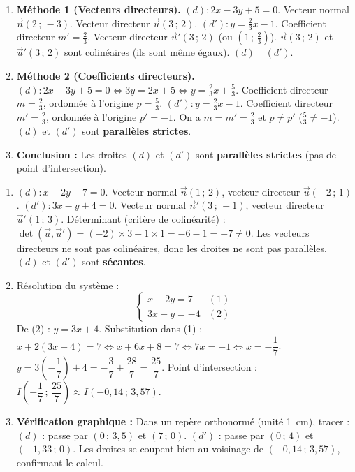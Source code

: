 \documentclass[11pt]{article}
\begin{document}
\begin{corrige}
\begin{enumerate}
\item \textbf{Méthode 1 (Vecteurs directeurs).}
$(d) : 2x - 3y + 5 = 0$. Vecteur normal $\vec{n}(2\,;\,-3)$. Vecteur directeur $\vec{u}(3\,;\,2)$.
$(d') : y = \frac{2}{3}x - 1$. Coefficient directeur $m' = \frac{2}{3}$. Vecteur directeur $\vec{u}'(3\,;\,2)$ (ou $(1\,;\,\frac{2}{3})$).
$\vec{u}(3\,;\,2)$ et $\vec{u}'(3\,;\,2)$ sont colinéaires (ils sont même égaux).
\Rightarrow $(d) \parallel (d')$.
\item \textbf{Méthode 2 (Coefficients directeurs).}
$(d) : 2x - 3y + 5 = 0 \iff 3y = 2x + 5 \iff y = \frac{2}{3}x + \frac{5}{3}$.
Coefficient directeur $m = \frac{2}{3}$, ordonnée à l'origine $p = \frac{5}{3}$.
$(d') : y = \frac{2}{3}x - 1$. Coefficient directeur $m' = \frac{2}{3}$, ordonnée à l'origine $p' = -1$.
On a $m = m' = \frac{2}{3}$ et $p \neq p'$ ($\frac{5}{3} \neq -1$).
\Rightarrow $(d)$ et $(d')$ sont \textbf{parallèles strictes}.
\item \textbf{Conclusion :} Les droites $(d)$ et $(d')$ sont \textbf{parallèles strictes} (pas de point d'intersection).
\end{enumerate}
\end{corrige}

\begin{corrige}
\begin{enumerate}
\item $(d) : x + 2y - 7 = 0$. Vecteur normal $\vec{n}(1\,;\,2)$, vecteur directeur $\vec{u}(-2\,;\,1)$.
$(d') : 3x - y + 4 = 0$. Vecteur normal $\vec{n}'(3\,;\,-1)$, vecteur directeur $\vec{u}'(1\,;\,3)$.
Déterminant (critère de colinéarité) : $\det(\vec{u},\vec{u}') = (-2)\times 3 - 1\times 1 = -6 - 1 = -7 \neq 0$.
Les vecteurs directeurs ne sont pas colinéaires, donc les droites ne sont pas parallèles.
\Rightarrow $(d)$ et $(d')$ sont \textbf{sécantes}.
\item Résolution du système :
\[
\begin{cases}
x + 2y = 7 & (1)\\
3x - y = -4 & (2)
\end{cases}
\]
De (2) : $y = 3x + 4$.
Substitution dans (1) : $x + 2(3x + 4) = 7 \iff x + 6x + 8 = 7 \iff 7x = -1 \iff x = -\dfrac{1}{7}$.
$y = 3\left(-\dfrac{1}{7}\right) + 4 = -\dfrac{3}{7} + \dfrac{28}{7} = \dfrac{25}{7}$.
Point d'intersection : $\boxed{I\left(-\dfrac{1}{7}\,;\,\dfrac{25}{7}\right)} \approx I(-0,14\,;\,3,57)$.
\item \textbf{Vérification graphique :} Dans un repère orthonormé (unité \SI{1}{cm}), tracer :
$(d)$ : passe par $(0\,;\,3,5)$ et $(7\,;\,0)$.
$(d')$ : passe par $(0\,;\,4)$ et $(-1,33\,;\,0)$.
Les droites se coupent bien au voisinage de $(-0,14\,;\,3,57)$, confirmant le calcul.
\end{enumerate}
\end{corrige}
\end{document}
